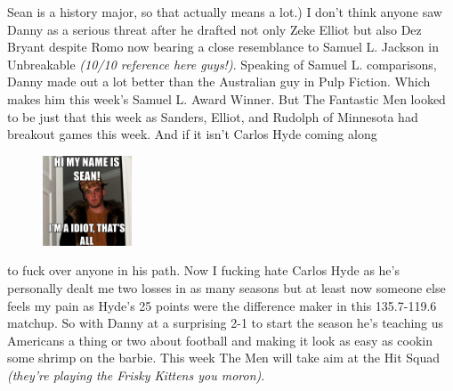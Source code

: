 \documentclass[11pt,letterpaper]{article}
\begin{document}
\par\noindent 
Sean is a history major, so that actually means a lot.) I don't think anyone saw Danny as a serious threat after he drafted not only Zeke Elliot but also Dez Bryant despite Romo now bearing a close resemblance to Samuel L. Jackson in Unbreakable \textit{(10/10 reference here guys!)}. Speaking of Samuel L. comparisons, 
Danny made out a lot better than the Australian guy in Pulp Fiction. Which makes him this week's Samuel L. Award Winner. But The Fantastic Men looked to be just that this week as Sanders, Elliot, and Rudolph of Minnesota had breakout games this week. And if it isn't Carlos Hyde coming along
\begin{figure}
\centering
\vspace{-10pt}
\includegraphics[width=0.235\textwidth]{week3-sean.png}
\label{fig:week3-sean}
\end{figure} 
\par\noindent to fuck over anyone in his path.  Now I fucking hate Carlos Hyde as he's personally dealt me two losses in as many seasons but at least now someone else feels my pain as Hyde's 25 points were the difference maker in this 135.7-119.6 matchup. So with Danny at a surprising 2-1 to start the season he's teaching us Americans a thing or two about football and making it look as easy as cookin some shrimp on the barbie. This week The Men will take aim at the Hit Squad \textit{(they're playing the Frisky Kittens you moron)}.
\end{document}
